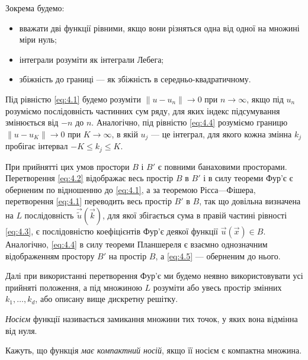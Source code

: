 Зокрема будемо:
\begin{itemize}
    \item вважати дві функції рівними, якщо вони різняться одна від одної на множині міри нуль;
    \item інтеграли розуміти як інтеграли Лебега;
    \item збіжність до границі --- як збіжність в середньо-квадратичному. 
\end{itemize}

Під рівністю \eqref{eq:4.1} будемо розуміти $\|u - u_n\| \to 0$ при $n \to \infty$, якщо під $u_n$ розуміємо послідовність частинних сум ряду, для яких індекс підсумування змінюється від $-n$ до $n$. Аналогічно, під рівністю \eqref{eq:4.4} розуміємо границю $\|u - u_K\| \to 0$ при $K \to \infty$, в якій $u_j$ --- це інтеграл, для якого кожна змінна $k_j$ пробігає інтервал $-K \le k_j \le K$. \medskip

При прийнятті цих умов простори $B$ і $B'$ є повними банаховими просторами. Перетворення \eqref{eq:4.2} відображає весь простір $B$ в $B'$ і в силу теореми Фур'є є оберненим по відношенню до \eqref{eq:4.1}, а за теоремою Рісса---Фішера, перетворення \eqref{eq:4.1} переводить весь простір $B'$ в $B$, так що довільна визначена на $L$ послідовність $\vec{\tilde{u}} \left( \vec k \right)$, для якої збігається сума в правій частині рівності \eqref{eq:4.3}, є послідовністю коефіцієнтів Фур'є деякої функції $\vec u \left( \vec x \right) \in B$. Аналогічно, \eqref{eq:4.4} в силу теореми Планшереля є взаємно однозначним відображенням простору $B'$ на простір $B$, а \eqref{eq:4.5} --- оберненим до нього. \medskip

Далі при використанні перетворення Фур'є ми будемо неявно використовувати усі прийняті положення, а під множиною $L$ розуміти або увесь простір змінних $k_1, \ldots, k_d$, або описану вище дискретну решітку.

\begin{definition}
    \emph{Носієм} функції називається замикання множини тих точок, у яких вона відмінна від нуля.
\end{definition}

\begin{definition}
    Кажуть, що функція \emph{має компактний носій}, якщо її носієм є компактна множина.
\end{definition}

